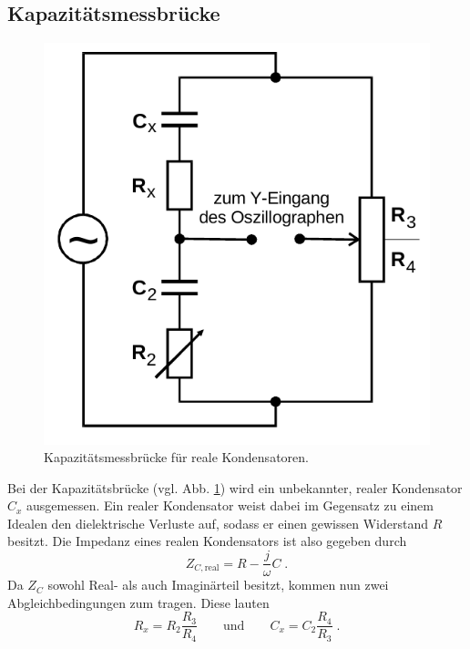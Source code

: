 \subsection{Kapazitätsmessbrücke}            
\label{sec:Cbrücke}
\begin{figure}[H]
    \centering
    \includegraphics[scale=0.4]{pictures/3-C.png}
    \caption{Kapazitätsmessbrücke für reale Kondensatoren. \cite{AP01}}
    \label{fig:Cbrücke}
\end{figure}
Bei der Kapazitätsbrücke (vgl. Abb. \ref{fig:Cbrücke}) wird ein unbekannter, realer Kondensator $C_x$ ausgemessen. Ein realer Kondensator 
weist dabei im Gegensatz zu einem Idealen den dielektrische Verluste auf, sodass er einen gewissen Widerstand $R$ besitzt. Die Impedanz 
eines realen Kondensators ist also gegeben durch 
\begin{equation}
    Z_{C,\text{real}}=R-\frac{j}{\omega}C \;.
\end{equation}
Da $Z_C$ sowohl Real- als auch Imaginärteil besitzt, kommen nun zwei Abgleichbedingungen zum tragen. Diese lauten 
\begin{equation}
    R_x=R_2\frac{R_3}{R_4} 
    \qquad\text{und}\qquad
    C_x=C_2\frac{R_4}{R_3} \;.
    \label{eqn:Lbrücke}
\end{equation}

